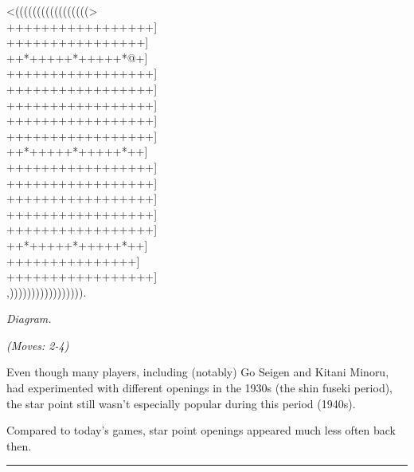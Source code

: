 \documentclass[letterpaper,12pt]{memoir}
\newcounter{GoFigure}[part]
\newcommand{\gofigure}{%
 \stepcounter{GoFigure}
 \centerline{\textit{Diagram.\thinspace\arabic{GoFigure}}}
}
\newcommand{\subtext}[1]{\centerline{\textit{#1}}}
\begin{document}
\begin{minipage}[t]{240pt}
\label{Fujisawa-Hosai-vs-Go-Seigen-19430225:mainmove-2}
{\gnos
<(((((((((((((((((>\\
+++++++++++++++++]\\
++++++++++++++++]\\
++*+++++*+++++*@+]\\
+++++++++++++++++]\\
+++++++++++++++++]\\
+++++++++++++++++]\\
+++++++++++++++++]\\
+++++++++++++++++]\\
++*+++++*+++++*++]\\
+++++++++++++++++]\\
+++++++++++++++++]\\
+++++++++++++++++]\\
+++++++++++++++++]\\
+++++++++++++++++]\\
++*+++++*+++++*++]\\
+++++++++++++++]\\
+++++++++++++++++]\\
,))))))))))))))))).\\
}
\gofigure
\subtext{(Moves: 2-4)}
\end{minipage}
\begin{minipage}[t]{268.19999999999993pt}
\setlength{\parskip}{0.5em}
Even though many players, including (notably) Go Seigen and Kitani Minoru, had experimented with different openings in the 1930s (the shin fuseki period), the star point still wasn't especially popular during this period (1940s).

Compared to today's games, star point openings appeared much less often back then.


\end{minipage}
\vfill

\rule{\textwidth}{0.5pt}
\end{document}
